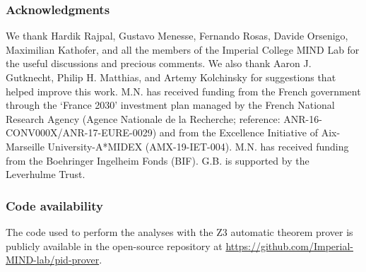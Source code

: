 \documentclass{article}
\begin{document}
\subsubsection*{Acknowledgments}
We thank Hardik Rajpal, Gustavo Menesse, Fernando Rosas, Davide Orsenigo, Maximilian Kathofer, and all the members of the Imperial College MIND Lab for the useful discussions and precious comments. We also thank Aaron J. Gutknecht, Philip H. Matthias, and Artemy Kolchinsky for suggestions that helped improve this work.
M.N. has received funding from the French government through the ‘France 2030’ investment plan managed by the French National Research Agency (Agence Nationale de la Recherche; reference: ANR-16-CONV000X/ANR-17-EURE-0029) and from the Excellence Initiative of Aix-Marseille University-A*MIDEX (AMX-19-IET-004). M.N. has received funding from the Boehringer Ingelheim Fonds (BIF). G.B. is supported by the Leverhulme Trust.

\subsubsection*{Code availability}
The code used to perform the analyses with the Z3 automatic theorem prover is publicly available in the open-source repository at \url{https://github.com/Imperial-MIND-lab/pid-prover}.

\clearpage
\newpage
\appendix
\end{document}
